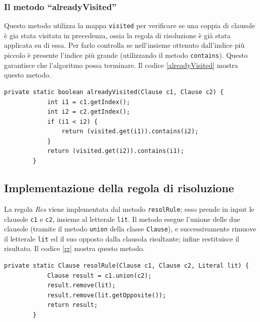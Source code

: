 \documentclass[a4paper,12pt]{report}
\begin{document}
\subsubsection{Il metodo ``alreadyVisited''}
Questo metodo utilizza la mappa \texttt{visited} per verificare se una coppia di clausole è gia stata visitata in precedenza, ossia la regola di risoluzione è già stata applicata su di essa. Per farlo controlla se nell'insieme ottenuto dall'indice più piccolo è presente l'indice più grande (utilizzando il metodo \texttt{contains}). Questo garantisce che l'algoritmo possa terminare. Il codice \ref{alreadyVisited} mostra questo metodo.

\begin{minipage}{\linewidth}
    \begin{lstlisting}[caption={Metodo ``alreadyVisited'' della classe Resolution}, label={alreadyVisited}]
        private static boolean alreadyVisited(Clause c1, Clause c2) {
            int i1 = c1.getIndex();
            int i2 = c2.getIndex();
            if (i1 < i2) {
                return (visited.get(i1)).contains(i2);
            }
            return (visited.get(i2)).contains(i1);
        }
    \end{lstlisting}
\end{minipage}

\subsection{Implementazione della regola di risoluzione}
\label{resolRule}
La regola \emph{Res} viene implementata dal metodo \texttt{resolRule}; esso prende in input le clausole \texttt{c1} e \texttt{c2}, insieme al letterale \texttt{lit}. Il metodo esegue l'unione delle due clausole (tramite il metodo \texttt{union} della classe \texttt{Clause}), e successivamente rimuove il letterale \texttt{lit} ed il suo opposto dalla clausola risultante; infine restituisce il risultato. Il codice \ref{rr} mostra questo metodo.

\begin{minipage}{\linewidth}
    \begin{lstlisting}[caption={Metodo ``resolRule'' della classe Resolution}, label={rr}]
        private static Clause resolRule(Clause c1, Clause c2, Literal lit) {
            Clause result = c1.union(c2);
            result.remove(lit);
            result.remove(lit.getOpposite());
            return result;
        }
    \end{lstlisting}
\end{minipage}
\end{document}
